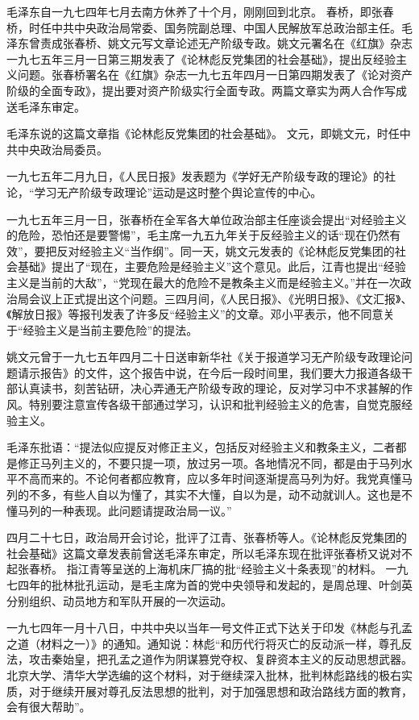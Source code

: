 \begin{maonote}
毛泽东自一九七四年七月去南方休养了十个月，刚刚回到北京。
春桥，即张春桥，时任中共中央政治局常委、国务院副总理、中国人民解放军总政治部主任。毛泽东曾责成张春桥、姚文元写文章论述无产阶级专政。姚文元署名在《红旗》杂志一九七五年三月一日第三期发表了《论林彪反党集团的社会基础》，提出反经验主义问题。张春桥署名在《红旗》杂志一九七五年四月一日第四期发表了《论对资产阶级的全面专政》，提出要对资产阶级实行全面专政。两篇文章实为两人合作写成送毛泽东审定。

毛泽东说的这篇文章指《论林彪反党集团的社会基础》。
文元，即姚文元，时任中共中央政治局委员。

一九七五年二月九日，《人民日报》发表题为《学好无产阶级专政的理论》的社论，“学习无产阶级专政理论”运动是这时整个舆论宣传的中心。

一九七五年三月一日，张春桥在全军各大单位政治部主任座谈会提出“对经验主义的危险，恐怕还是要警惕”，毛主席一九五九年关于反经验主义的话“现在仍然有效”，要把反对经验主义“当作纲”。同一天，姚文元发表的《论林彪反党集团的社会基础》提出了“现在，主要危险是经验主义”这个意见。此后，江青也提出“经验主义是当前的大敌”，“党现在最大的危险不是教条主义而是经验主义。”并在一次政治局会议上正式提出这个问题。三四月间，《人民日报》、《光明日报》、《文汇报》、《解放日报》等报刊发表了许多反“经验主义”的文章。邓小平表示，他不同意关于“经验主义是当前主要危险”的提法。

姚文元曾于一九七五年四月二十日送审新华社《关于报道学习无产阶级专政理论问题请示报告》的文件，这个报告中说，在今后一段时间里，我们要大力报道各级干部认真读书，刻苦钻研，决心弄通无产阶级专政的理论，反对学习中不求甚解的作风。特别要注意宣传各级干部通过学习，认识和批判经验主义的危害，自觉克服经验主义。

毛泽东批语：“提法似应提反对修正主义，包括反对经验主义和教条主义，二者都是修正马列主义的，不要只提一项，放过另一项。各地情况不同，都是由于马列水平不高而来的。不论何者都应教育，应以多年时间逐渐提高马列为好。我党真懂马列的不多，有些人自以为懂了，其实不大懂，自以为是，动不动就训人。这也是不懂马列的一种表现。此问题请提政治局一议。”

四月二十七日，政治局开会讨论，批评了江青、张春桥等人。《论林彪反党集团的社会基础》这篇文章发表前曾送毛泽东审定，所以毛泽东现在批评张春桥又说对不起张春桥。
指江青等呈送的上海机床厂搞的批“经验主义十条表现”的材料。
一九七四年的批林批孔运动，是毛主席为首的党中央领导和发起的，是周总理、叶剑英分别组织、动员地方和军队开展的一次运动。

一九七四年一月十八日，中共中央以当年一号文件正式下达关于印发《林彪与孔孟之道（材料之一）》的通知。通知说：林彪“和历代行将灭亡的反动派一样，尊孔反法，攻击秦始皇，把孔孟之道作为阴谋篡党夺权、复辟资本主义的反动思想武器。北京大学、清华大学选编的这个材料，对于继续深入批林，批判林彪路线的极右实质，对于继续开展对尊孔反法思想的批判，对于加强思想和政治路线方面的教育，会有很大帮助”。


\end{maonote}
